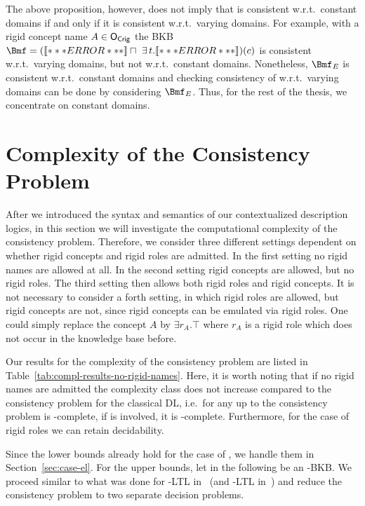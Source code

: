 
The above proposition, however, does not imply that \Bmf is consistent w.r.t.\ constant domains if
and only if it is consistent w.r.t.\ varying domains. For example, with a rigid concept name
$A\in\mathsf{O_{Crig}}$ the BKB
$\Bmf = (\oax{\top \sqsubseteq A} \sqcap\ \exists t.\oax{A \sqsubseteq \exists r.\lnot A})(c)$ is consistent w.r.t.\ varying domains, but not w.r.t.\ constant domains. Nonetheless,
$\Bmf_{E}$ is consistent w.r.t.\ constant domains and checking consistency of \Bmf w.r.t.\ varying
domains can be done by considering $\Bmf_{E}$.  Thus, for the rest of the thesis, we concentrate on
constant domains.

\section{Complexity of the Consistency Problem}
\label{sec:complexity-consis-problem}

After we introduced the syntax and semantics of our contextualized description logics, in this
section we will investigate the computational complexity of the consistency problem. Therefore, we
consider three different settings dependent on whether rigid concepts and rigid roles are
admitted. In the first setting no rigid names are allowed at all. In the second setting rigid
concepts are allowed, but no rigid roles. The third setting then allows both rigid roles and rigid
concepts. It is not necessary to consider a forth setting, in which rigid roles are allowed, but
rigid concepts are not, since rigid concepts can be emulated via rigid roles. One could simply
replace the concept $A$ by $\exists r_{A}.\top$ where $r_{A}$ is a rigid role which does not occur
in the knowledge base before.

Our results for the complexity of the consistency problem are listed in
Table~\ref{tab:compl-results-no-rigid-names}. Here, it is worth noting that if no rigid names are
admitted the complexity class does not increase compared to the consistency problem for the
classical DL, i.e.\ for any \LMLO up to \SHOQSHOQ the consistency problem is \ExpTime-complete, if
\SHOIQ is involved, it is \NExpTime-complete. Furthermore, for the case of rigid roles we can retain
decidability.



Since the lower bounds already hold for the case of \EL, we handle them in Section~\ref{sec:case-el}.
%
For the upper bounds, let in the following \BB be an \LMLO-BKB.  We proceed
similar to what was done for \ALC-LTL in~\cite{BaGL-KR08,BaGL-ToCL12} (and
\SHOQ-LTL in~\cite{Lip-PhD14}) and reduce the consistency problem to two separate
decision problems.

